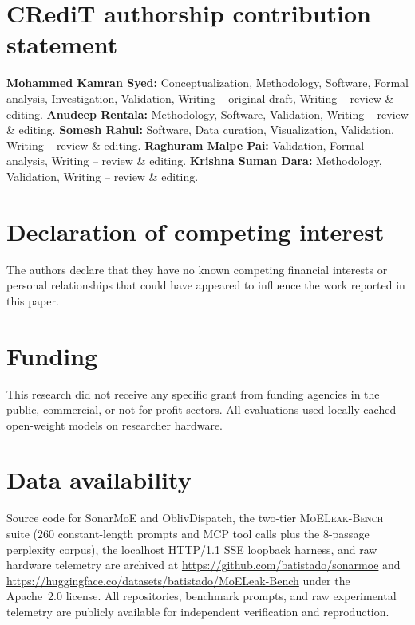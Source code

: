 \documentclass[final,5p,times,twocolumn]{elsarticle}
\def\SM{SonarMoE}%
\def\OD{OblivDispatch}%
\theoremstyle{definition}
\theoremstyle{remark}
\newcommand{\SM}{\textsc{SonarMoE}}
\newcommand{\OD}{\textsc{OblivDispatch}}
\newcommand{\MLB}{\textsc{MoELeak-Bench}}
\begin{document}
\section*{CRediT authorship contribution statement}
\textbf{Mohammed Kamran Syed:} Conceptualization, Methodology, Software, Formal analysis, Investigation, Validation, Writing -- original draft, Writing -- review \& editing.
\textbf{Anudeep Rentala:} Methodology, Software, Validation, Writing -- review \& editing.
\textbf{Somesh Rahul:} Software, Data curation, Visualization, Validation, Writing -- review \& editing.
\textbf{Raghuram Malpe Pai:} Validation, Formal analysis, Writing -- review \& editing.
\textbf{Krishna Suman Dara:} Methodology, Validation, Writing -- review \& editing.

\section*{Declaration of competing interest}
The authors declare that they have no known competing financial interests or personal relationships that could have appeared to influence the work reported in this paper.

\section*{Funding}
This research did not receive any specific grant from funding agencies in the public, commercial, or not-for-profit sectors. All evaluations used locally cached open-weight models on researcher hardware.

\section*{Data availability}
Source code for \SM{} and \OD{}, the two-tier \MLB{} suite ($260$ constant-length prompts and MCP tool calls plus the $8$-passage perplexity corpus), the localhost HTTP/1.1 SSE loopback harness, and raw hardware telemetry are archived at \url{https://github.com/batistado/sonarmoe} and \url{https://huggingface.co/datasets/batistado/MoELeak-Bench} under the Apache~2.0 license. All repositories, benchmark prompts, and raw experimental telemetry are publicly available for independent verification and reproduction.



\end{document}
